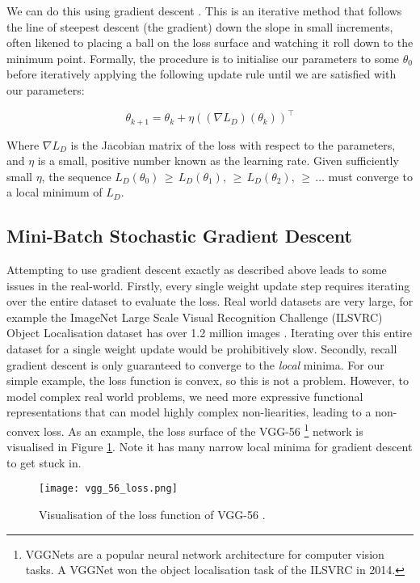 We can do this using gradient descent \cite{Cauchy1847}. This is an iterative method that follows the line of steepest descent (the gradient) down the slope in small increments, often likened to placing a ball on the loss surface and watching it roll down to the minimum point. Formally, the procedure is to initialise our parameters to some \(\theta_0\) before iteratively applying the following update rule until we are satisfied with our parameters:

\begin{equation*}
    \theta_{k+1} = \theta_k + \eta((\nabla L_D)(\theta_k))^\top
\end{equation*}

Where \(\nabla L_D\) is the Jacobian matrix of the loss with respect to the parameters, and \(\eta\) is a small, positive number known as the learning rate. Given sufficiently small \(\eta\), the sequence \(L_D(\theta_0) \,\geq\, L_D(\theta_1), \,\geq\, L_D(\theta_2), \,\geq\, \ldots\) must converge to a local minimum of \(L_D\). 

\subsection{Mini-Batch Stochastic Gradient Descent}
Attempting to use gradient descent exactly as described above leads to some issues in the real-world. Firstly, every single weight update step requires iterating over the entire dataset to evaluate the loss. Real world datasets are very large, for example the ImageNet Large Scale Visual Recognition Challenge (ILSVRC) Object Localisation dataset has over 1.2 million images \cite{ILSVRC15}. Iterating over this entire dataset for a single weight update would be prohibitively slow. Secondly, recall gradient descent is only guaranteed to converge to the \textit{local} minima. For our simple example, the loss function is convex, so this is not a problem. However, to model complex real world problems, we need more expressive functional representations that can model highly complex non-liearities, leading to a non-convex loss. As an example, the loss surface of the VGG-56 \footnote{VGGNets are a popular neural network architecture for computer vision tasks. A VGGNet won the object localisation task of the ILSVRC in 2014.} network \cite{Simonyan2014} is visualised in Figure \ref{fig:2-vgg-loss}. Note it has many narrow local minima for gradient descent to get stuck in.

\begin{figure}[h]
    \centering
    \texttt{[image: vgg\_56\_loss.png]}
    \caption{Visualisation of the loss function of VGG-56 \cite{Li2018}.}
    \label{fig:2-vgg-loss}
\end{figure}

